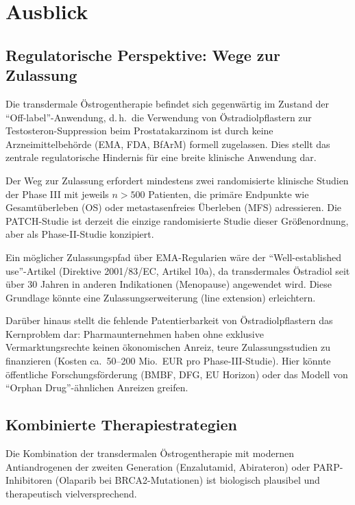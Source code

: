 ﻿\documentclass[a4paper,12pt]{article}
\theoremstyle{definition}
\begin{document}
\section{Ausblick}

\subsection{Regulatorische Perspektive: Wege zur Zulassung}

Die transdermale Östrogentherapie befindet sich gegenwärtig im Zustand der ``Off-label''-Anwendung, d.\,h.\ die Verwendung von Östradiolpflastern zur Testosteron-Suppression beim Prostatakarzinom ist durch keine Arzneimittelbehörde (EMA, FDA, BfArM) formell zugelassen.
Dies stellt das zentrale regulatorische Hindernis für eine breite klinische Anwendung dar.

Der Weg zur Zulassung erfordert mindestens zwei randomisierte klinische Studien der Phase III mit jeweils $n > 500$ Patienten, die primäre Endpunkte wie Gesamtüberleben (OS) oder metastasenfreies Überleben (MFS) adressieren.
Die PATCH-Studie ist derzeit die einzige randomisierte Studie dieser Größenordnung, aber als Phase-II-Studie konzipiert.

Ein möglicher Zulassungspfad über EMA-Regularien wäre der ``Well-established use''-Artikel (Direktive 2001/83/EC, Artikel 10a), da transdermales Östradiol seit über 30 Jahren in anderen Indikationen (Menopause) angewendet wird.
Diese Grundlage könnte eine Zulassungserweiterung (line extension) erleichtern.

Darüber hinaus stellt die fehlende Patentierbarkeit von Östradiolpflastern das Kernproblem dar: Pharmaunternehmen haben ohne exklusive Vermarktungsrechte keinen ökonomischen Anreiz, teure Zulassungsstudien zu finanzieren (Kosten ca.\ 50--200 Mio.\ EUR pro Phase-III-Studie).
Hier könnte öffentliche Forschungsförderung (BMBF, DFG, EU Horizon) oder das Modell von ``Orphan Drug''-ähnlichen Anreizen greifen.

\subsection{Kombinierte Therapiestrategien}

Die Kombination der transdermalen Östrogentherapie mit modernen Antiandrogenen der zweiten Generation (Enzalutamid, Abirateron) oder PARP-Inhibitoren (Olaparib bei BRCA2-Mutationen) ist biologisch plausibel und therapeutisch vielversprechend.
\end{document}
